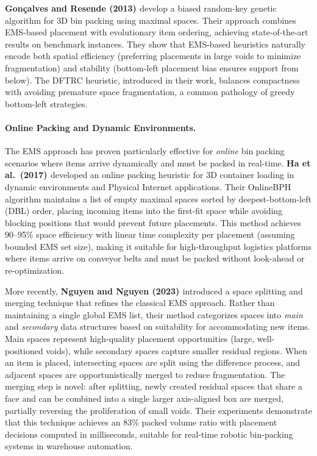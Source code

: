 \textbf{Gonçalves and Resende (2013) \cite{GR13}} develop a biased random-key genetic algorithm for 3D bin packing using maximal spaces. Their approach combines EMS-based placement with evolutionary item ordering, achieving state-of-the-art results on benchmark instances. They show that EMS-based heuristics naturally encode both spatial efficiency (preferring placements in large voids to minimize fragmentation) and stability (bottom-left placement bias ensures support from below). The DFTRC heuristic, introduced in their work, balances compactness with avoiding premature space fragmentation, a common pathology of greedy bottom-left strategies.

\paragraph{Online Packing and Dynamic Environments.}
The EMS approach has proven particularly effective for \textit{online} bin packing scenarios where items arrive dynamically and must be packed in real-time. \textbf{Ha et al.\ (2017) \cite{HNBW17}} developed an online packing heuristic for 3D container loading in dynamic environments and Physical Internet applications. Their OnlineBPH algorithm maintains a list of empty maximal spaces sorted by deepest-bottom-left (DBL) order, placing incoming items into the first-fit space while avoiding blocking positions that would prevent future placements. This method achieves 90--95\% space efficiency with linear time complexity per placement (assuming bounded EMS set size), making it suitable for high-throughput logistics platforms where items arrive on conveyor belts and must be packed without look-ahead or re-optimization.

More recently, \textbf{Nguyen and Nguyen (2023) \cite{NN23}} introduced a space splitting and merging technique that refines the classical EMS approach. Rather than maintaining a single global EMS list, their method categorizes spaces into \textit{main} and \textit{secondary} data structures based on suitability for accommodating new items. Main spaces represent high-quality placement opportunities (large, well-positioned voids), while secondary spaces capture smaller residual regions. When an item is placed, intersecting spaces are split using the difference process, and adjacent spaces are opportunistically merged to reduce fragmentation. The merging step is novel: after splitting, newly created residual spaces that share a face and can be combined into a single larger axis-aligned box are merged, partially reversing the proliferation of small voids. Their experiments demonstrate that this technique achieves an 83\% packed volume ratio with placement decisions computed in milliseconds, suitable for real-time robotic bin-packing systems in warehouse automation.

